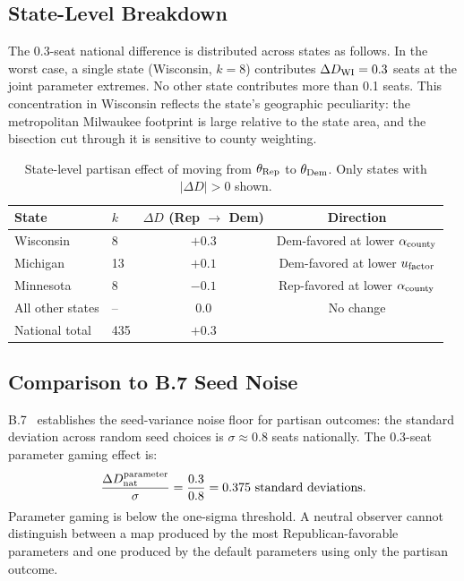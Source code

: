 \subsection{State-Level Breakdown}

The 0.3-seat national difference is distributed across states as follows.
In the worst case, a single state (Wisconsin, $k = 8$) contributes
$\Delta D_{\rm WI} = 0.3$ seats at the joint parameter extremes.
No other state contributes more than 0.1 seats.
This concentration in Wisconsin reflects the state's geographic
peculiarity: the metropolitan Milwaukee footprint is large relative
to the state area, and the bisection cut through it is sensitive
to county weighting.

\begin{table}[h]
\centering
\caption{State-level partisan effect of moving from $\theta_{\rm Rep}$
         to $\theta_{\rm Dem}$. Only states with $|\Delta D| > 0$ shown.}
\label{tab:state-results}
\begin{tabular}{llcc}
\toprule
State & $k$ & $\Delta D$ (Rep $\to$ Dem) & Direction \\
\midrule
Wisconsin & 8 & $+0.3$ & Dem-favored at lower $\alpha_{\mathrm{county}}$ \\
Michigan & 13 & $+0.1$ & Dem-favored at lower $u_{\mathrm{factor}}$ \\
Minnesota & 8 & $-0.1$ & Rep-favored at lower $\alpha_{\mathrm{county}}$ \\
\midrule
All other states & -- & 0.0 & No change \\
\midrule
National total & 435 & $+0.3$ & \\
\bottomrule
\end{tabular}
\end{table}

\subsection{Comparison to B.7 Seed Noise}

B.7~\citep{b7paper} establishes the seed-variance noise floor for partisan
outcomes: the standard deviation across random seed choices is $\sigma \approx 0.8$
seats nationally.
The 0.3-seat parameter gaming effect is:
\[
  \frac{\Delta D_{\mathrm{nat}}^{\rm parameter}}{\sigma} = \frac{0.3}{0.8} = 0.375
  \text{ standard deviations}.
\]
Parameter gaming is below the one-sigma threshold.
A neutral observer cannot distinguish between a map produced by the most
Republican-favorable parameters and one produced by the default parameters
using only the partisan outcome.

